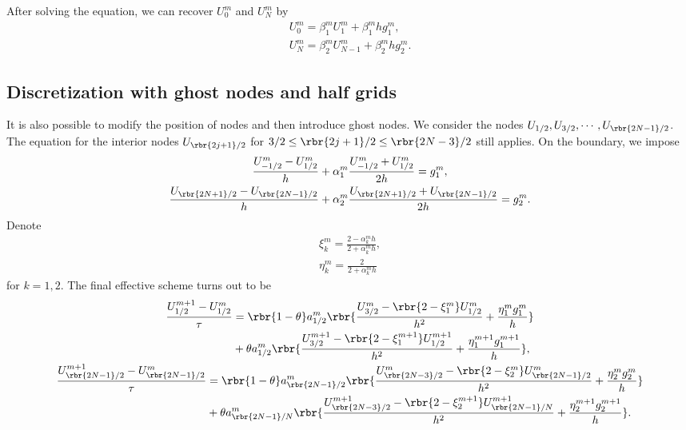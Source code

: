 \documentclass[english, nochinese]{pnote}
\begin{document}
After solving the equation, we can recover $U_0^m$ and $U_N^m$ by
\begin{gather}
\label{Eq:Half1}
U_0^m = \beta_1^m U_1^m + \beta_1^m h g_1^m, \\
\label{Eq:Half2}
U_N^m = \beta_2^m U_{ N - 1 }^m + \beta_2^m h g_2^m.
\end{gather}

\subsection{Discretization with ghost nodes and half grids}

It is also possible to modify the position of nodes and then introduce ghost nodes. We consider the nodes $ U_{ 1 / 2 }, U_{ 3 / 2 }, \cdots, U_{ \rbr{ 2 N - 1 } / 2 } $. The equation for the interior nodes $ U_{ \rbr{ 2 j + 1 } / 2 } $ for $ 3 / 2 \le \rbr{ 2 j + 1 } / 2 \le \rbr{ 2 N - 3 } / 2 $ still applies. On the boundary, we impose
\begin{gather}
\frac{ U_{ -1 / 2 }^m - U_{ 1 / 2 }^m }{h} + \alpha_1^m \frac{ U_{ -1 / 2 }^m + U_{ 1 / 2 }^m }{ 2 h } = g_1^m, \\
\frac{ U_{ \rbr{ 2 N + 1 } / 2 } - U_{ \rbr{ 2 N - 1 } / 2 } }{h} + \alpha_2^m \frac{ U_{ \rbr{ 2 N + 1 } / 2 } + U_{ \rbr{ 2 N - 1 } / 2 } }{ 2 h } = g_2^m.
\end{gather}
Denote
\begin{gather}
\xi_k^m = \frac{ 2 - \alpha_k^m h }{ 2 + \alpha_k^m h }, \\
\eta_k^m = \frac{2}{ 2 + \alpha_k^m h }
\end{gather}
for $ k = 1, 2 $. The final effective scheme turns out to be
\begin{gather}
\begin{split}
\frac{ U_{ 1 / 2 }^{ m + 1 } - U_{ 1 / 2 }^m }{\tau} &= \rbr{ 1 - \theta } a_{ 1 / 2 }^m \rbr{ \frac{ U_{ 3 / 2 }^m - \rbr{ 2 - \xi_1^m } U_{ 1 / 2 }^m }{h^2} + \frac{ \eta_1^m g_1^m }{h} } \\
&+ \theta a_{ 1 / 2 }^m \rbr{ \frac{ U_{ 3 / 2 }^{ m + 1 } - \rbr{ 2 - \xi_1^{ m + 1 } } U_{ 1 / 2 }^{ m + 1 } }{h^2} + \frac{ \eta_1^{ m + 1 } g_1^{ m + 1 } }{h} },
\end{split}
\\
\begin{split}
\frac{ U_{ \rbr{ 2 N - 1 } / 2 }^{ m + 1 } - U_{ \rbr{ 2 N - 1 } / 2 }^m }{\tau} &= \rbr{ 1 - \theta } a_{ \rbr{ 2 N - 1 } / 2 }^m \rbr{ \frac{ U_{ \rbr{ 2 N - 3 } / 2 }^m - \rbr{ 2 - \xi_2^m } U_{ \rbr{ 2 N - 1 } / 2 }^m }{h^2} + \frac{ \eta_2^m g_2^m }{h} } \\
&+ \theta a_{ \rbr{ 2 N - 1 } / N }^m \rbr{ \frac{ U_{ \rbr{ 2 N - 3 } / 2 }^{ m + 1 } - \rbr{ 2 - \xi_2^{ m + 1 } } U_{ \rbr{ 2 N - 1 } / N }^{ m + 1 } }{h^2} + \frac{ \eta_2^{ m + 1 } g_2^{ m + 1 } }{h} }.
\end{split}
\end{gather}
\end{document}

